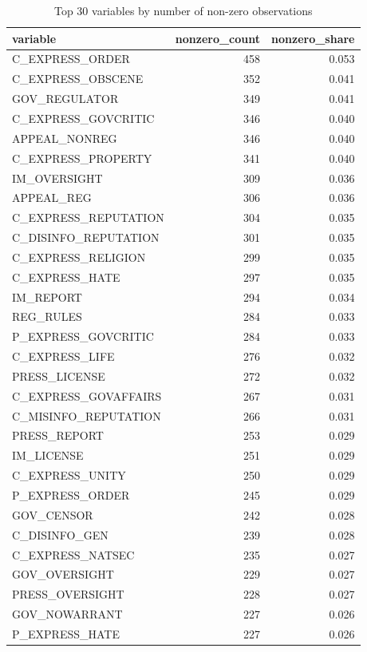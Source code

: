 \begin{table}
\caption{Top 30 variables by number of non-zero observations}
\label{tab:top_nonzero}
\begin{tabular}{lrr}
\toprule
variable & nonzero_count & nonzero_share \\
\midrule
C_EXPRESS_ORDER & 458 & 0.053 \\
C_EXPRESS_OBSCENE & 352 & 0.041 \\
GOV_REGULATOR & 349 & 0.041 \\
C_EXPRESS_GOVCRITIC & 346 & 0.040 \\
APPEAL_NONREG & 346 & 0.040 \\
C_EXPRESS_PROPERTY & 341 & 0.040 \\
IM_OVERSIGHT & 309 & 0.036 \\
APPEAL_REG & 306 & 0.036 \\
C_EXPRESS_REPUTATION & 304 & 0.035 \\
C_DISINFO_REPUTATION & 301 & 0.035 \\
C_EXPRESS_RELIGION & 299 & 0.035 \\
C_EXPRESS_HATE & 297 & 0.035 \\
IM_REPORT & 294 & 0.034 \\
REG_RULES & 284 & 0.033 \\
P_EXPRESS_GOVCRITIC & 284 & 0.033 \\
C_EXPRESS_LIFE & 276 & 0.032 \\
PRESS_LICENSE & 272 & 0.032 \\
C_EXPRESS_GOVAFFAIRS & 267 & 0.031 \\
C_MISINFO_REPUTATION & 266 & 0.031 \\
PRESS_REPORT & 253 & 0.029 \\
IM_LICENSE & 251 & 0.029 \\
C_EXPRESS_UNITY & 250 & 0.029 \\
P_EXPRESS_ORDER & 245 & 0.029 \\
GOV_CENSOR & 242 & 0.028 \\
C_DISINFO_GEN & 239 & 0.028 \\
C_EXPRESS_NATSEC & 235 & 0.027 \\
GOV_OVERSIGHT & 229 & 0.027 \\
PRESS_OVERSIGHT & 228 & 0.027 \\
GOV_NOWARRANT & 227 & 0.026 \\
P_EXPRESS_HATE & 227 & 0.026 \\
\bottomrule
\end{tabular}
\end{table}

